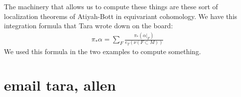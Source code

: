 \documentclass[12pt]{article}
\begin{document}
The machinery that allows us to compute these things are these sort of localization theorems of Atiyah-Bott in equivariant cohomology. We have this integration formula that Tara wrote down on the board: \begin{align*}
    \pi_*\alpha = \sum_F \frac{\pi_*(\alpha\vert_F)}{e_T(\nu(F\subset M))}
\end{align*} We used this formula in the two examples to compute something.


\section{email tara, allen}
\end{document}
